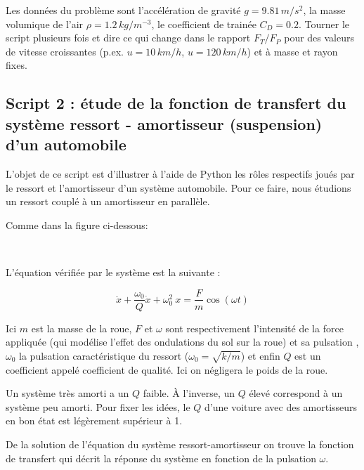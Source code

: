 \documentclass{article}
\begin{document}
    Les données du problème sont l'accélération de gravité
\(g=9.81 \, m /s^2\), la masse volumique de l'air
\(\rho = 1.2 \, kg/m^{-3}\), le coefficient de trainée \(C_D=0.2\).
Tourner le script plusieurs fois et dire ce qui change dans le rapport
\(F_T/F_P\) pour des valeurs de vitesse croissantes (p.ex.
\(u=10 \, km/h\), \(u=120 \, km/h\)) et à masse et rayon fixes.

    \subsection{Script 2 : étude de la fonction de transfert du système
ressort - amortisseur (suspension) d'un
automobile}\label{script-2-uxe9tude-de-la-fonction-de-transfert-du-systuxe8me-ressort---amortisseur-suspension-dun-automobile}

    L'objet de ce script est d'illustrer à l'aide de Python les rôles
respectifs joués par le ressort et l'amortisseur d'un système
automobile. Pour ce faire, nous étudions un ressort couplé à un
amortisseur en parallèle.

Comme dans la figure ci-dessous:

    \begin{center}
    \end{center}
    { \hspace*{\fill} \\}
    

    L'équation vérifiée par le système est la suivante :

\[ \ddot{x} + \frac{\omega_0}{Q} \dot{x} + \omega_0^2\ x = \frac{F}{m} \cos( \omega t) \]

    Ici \(m\) est la masse de la roue, \(F\) et \(\omega\) sont
respectivement l'intensité de la force appliquée (qui modélise l'effet
des ondulations du sol sur la roue) et sa pulsation , \(\omega_0\) la
pulsation caractéristique du ressort (\(\omega_0=\sqrt{k/m}\)) et enfin
\(Q\) est un coefficient appelé coefficient de qualité. Ici on négligera
le poids de la roue.

Un système très amorti a un \(Q\) faible. À l'inverse, un \(Q\) élevé
correspond à un système peu amorti. Pour fixer les idées, le \(Q\) d'une
voiture avec des amortisseurs en bon état est légèrement supérieur à 1.

    De la solution de l'équation du système ressort-amortisseur on trouve la
fonction de transfert qui décrit la réponse du système en fonction de la
pulsation \(\omega\).
\end{document}
